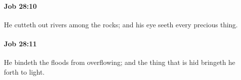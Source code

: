 		\paragraph{Job 28:10} %
			\label{JOB-28-10}

			He cutteth out rivers among the rocks; and his eye seeth every precious thing.


		\paragraph{Job 28:11} %
			\label{JOB-28-11}

			He bindeth the floods from overflowing; and the thing that is hid bringeth he forth to light.



